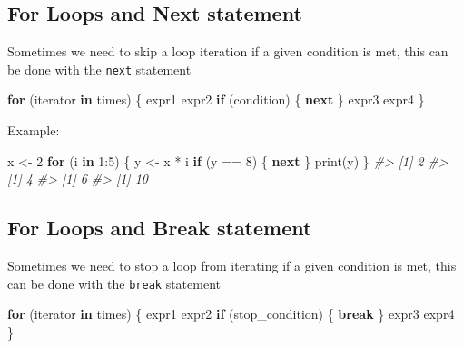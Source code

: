 \documentclass[
]{book}
\newenvironment{Shaded}{\begin{snugshade}}{\end{snugshade}}
\newcommand{\CommentTok}[1]{\textcolor[rgb]{0.56,0.35,0.01}{\textit{#1}}}
\newcommand{\ControlFlowTok}[1]{\textcolor[rgb]{0.13,0.29,0.53}{\textbf{#1}}}
\newcommand{\DecValTok}[1]{\textcolor[rgb]{0.00,0.00,0.81}{#1}}
\newcommand{\FunctionTok}[1]{\textcolor[rgb]{0.00,0.00,0.00}{#1}}
\newcommand{\NormalTok}[1]{#1}
\newcommand{\OtherTok}[1]{\textcolor[rgb]{0.56,0.35,0.01}{#1}}
\newcommand{\SpecialCharTok}[1]{\textcolor[rgb]{0.00,0.00,0.00}{#1}}
\begin{document}
\hypertarget{for-loops-and-next-statement}{%
\subsection{For Loops and Next statement}\label{for-loops-and-next-statement}}

Sometimes we need to skip a loop iteration if a given condition is met, this
can be done with the \texttt{next} statement

\begin{Shaded}
\begin{Highlighting}[]
\ControlFlowTok{for}\NormalTok{ (iterator }\ControlFlowTok{in}\NormalTok{ times) \{ }
\NormalTok{  expr1}
\NormalTok{  expr2}
  \ControlFlowTok{if}\NormalTok{ (condition) \{}
    \ControlFlowTok{next}
\NormalTok{  \}}
\NormalTok{  expr3}
\NormalTok{  expr4}
\NormalTok{\}}
\end{Highlighting}
\end{Shaded}

Example:

\begin{Shaded}
\begin{Highlighting}[]
\NormalTok{x }\OtherTok{\textless{}{-}} \DecValTok{2}
\ControlFlowTok{for}\NormalTok{ (i }\ControlFlowTok{in} \DecValTok{1}\SpecialCharTok{:}\DecValTok{5}\NormalTok{) \{}
\NormalTok{  y }\OtherTok{\textless{}{-}}\NormalTok{ x }\SpecialCharTok{*}\NormalTok{ i}
  \ControlFlowTok{if}\NormalTok{ (y }\SpecialCharTok{==} \DecValTok{8}\NormalTok{) \{}
    \ControlFlowTok{next}
\NormalTok{  \}}
  \FunctionTok{print}\NormalTok{(y)}
\NormalTok{\}}
\CommentTok{\#\textgreater{} [1] 2}
\CommentTok{\#\textgreater{} [1] 4}
\CommentTok{\#\textgreater{} [1] 6}
\CommentTok{\#\textgreater{} [1] 10}
\end{Highlighting}
\end{Shaded}

\hypertarget{for-loops-and-break-statement}{%
\subsection{For Loops and Break statement}\label{for-loops-and-break-statement}}

Sometimes we need to stop a loop from iterating if a given condition is met,
this can be done with the \texttt{break} statement

\begin{Shaded}
\begin{Highlighting}[]
\ControlFlowTok{for}\NormalTok{ (iterator }\ControlFlowTok{in}\NormalTok{ times) \{ }
\NormalTok{  expr1}
\NormalTok{  expr2}
  \ControlFlowTok{if}\NormalTok{ (stop\_condition) \{}
    \ControlFlowTok{break}
\NormalTok{  \}}
\NormalTok{  expr3}
\NormalTok{  expr4}
\NormalTok{\}}
\end{Highlighting}
\end{Shaded}
\end{document}
